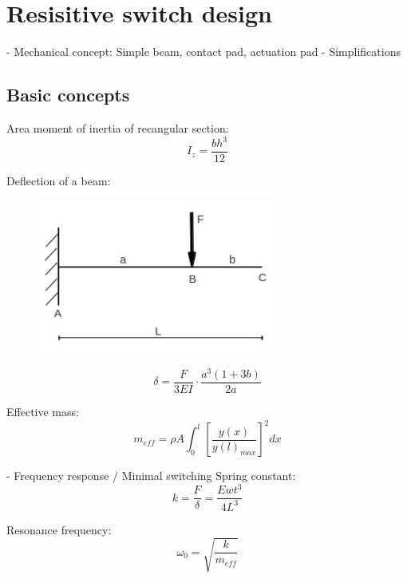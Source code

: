 \section{Resisitive switch design}
\label{sec:resisitive_switch_design}
- Mechanical concept: Simple beam, contact pad, actuation pad
- Simplifications

\subsection{Basic concepts}
\label{sec:basic_concepts}
Area moment of inertia of recangular section:
\begin{equation}
	I_z = \frac{bh^3}{12}
	\label{eq:area_moment_of_inertia}
\end{equation}

Deflection of a beam:
\begin{figure}[h]
	\centering
	\includegraphics[width=8cm]{fig/cantilever_beam_single_load.png}
	\label{fig:cantilever_beam_single_load}
\end{figure}

\begin{equation}
	\delta = \frac{F}{3EI}\cdot\frac{a^3(1+3b)}{2a}
	\label{eq:beam_deflection}
\end{equation}

Effective mass:
\begin{equation}
	m_{eff} = \rho A \int_0^l{\left[\frac{y(x)}{y(l)_{max}}\right]^2dx}
	\label{eq:effective_mass}
\end{equation}


- Frequency response / Minimal switching
Spring constant:
\begin{equation}
	k = \frac{F}{\delta} = \frac{Ewt^3}{4L^3}
	\label{eq:spring_constant}
\end{equation}

Resonance frequency:
\begin{equation}
	\omega_0 = \sqrt{\frac{k}{m_{eff}}}
	\label{eq:resonance_frequency}
\end{equation}


